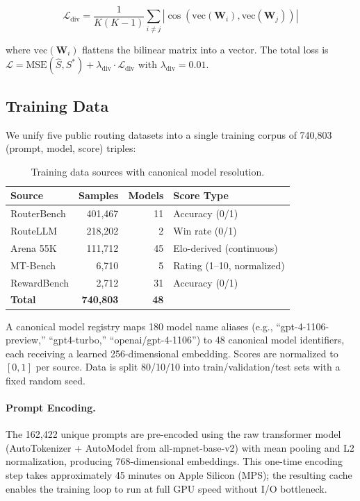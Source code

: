 \begin{equation}
\label{eq:diversity}
\mathcal{L}_{\text{div}} = \frac{1}{K(K-1)} \sum_{i \neq j} \left|\cos(\text{vec}(\mathbf{W}_i), \text{vec}(\mathbf{W}_j))\right|
\end{equation}

where $\text{vec}(\mathbf{W}_i)$ flattens the bilinear matrix into a vector. The total loss is $\mathcal{L} = \text{MSE}(\hat{S}, S^*) + \lambda_{\text{div}} \cdot \mathcal{L}_{\text{div}}$ with $\lambda_{\text{div}} = 0.01$.

\subsection{Training Data}

We unify five public routing datasets into a single training corpus of 740,803 (prompt, model, score) triples:

\begin{table}[h]
\centering
\caption{Training data sources with canonical model resolution.}
\label{tab:training_data}
\small
\begin{tabular}{lrrl}
\toprule
\textbf{Source} & \textbf{Samples} & \textbf{Models} & \textbf{Score Type} \\
\midrule
RouterBench & 401,467 & 11 & Accuracy (0/1) \\
RouteLLM & 218,202 & 2 & Win rate (0/1) \\
Arena 55K & 111,712 & 45 & Elo-derived (continuous) \\
MT-Bench & 6,710 & 5 & Rating (1--10, normalized) \\
RewardBench & 2,712 & 31 & Accuracy (0/1) \\
\midrule
\textbf{Total} & \textbf{740,803} & \textbf{48} & \\
\bottomrule
\end{tabular}
\end{table}

A canonical model registry maps 180 model name aliases (e.g., ``gpt-4-1106-preview,'' ``gpt4-turbo,'' ``openai/gpt-4-1106'') to 48 canonical model identifiers, each receiving a learned 256-dimensional embedding. Scores are normalized to $[0, 1]$ per source. Data is split 80/10/10 into train/validation/test sets with a fixed random seed.

\paragraph{Prompt Encoding.} The 162,422 unique prompts are pre-encoded using the raw transformer model (AutoTokenizer + AutoModel from all-mpnet-base-v2) with mean pooling and L2 normalization, producing 768-dimensional embeddings. This one-time encoding step takes approximately 45 minutes on Apple Silicon (MPS); the resulting cache enables the training loop to run at full GPU speed without I/O bottleneck.


